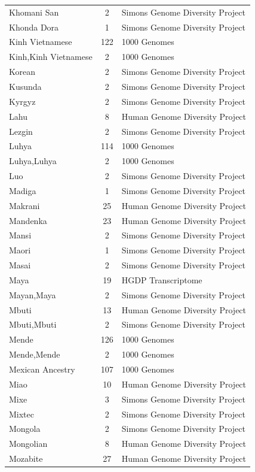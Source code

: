 \begin{longtable}[t]{lcl}
Khomani San & 2 & Simons Genome Diversity Project\\
Khonda Dora & 1 & Simons Genome Diversity Project\\
Kinh Vietnamese & 122 & 1000 Genomes\\
Kinh,Kinh Vietnamese & 2 & 1000 Genomes\\
Korean & 2 & Simons Genome Diversity Project\\
Kusunda & 2 & Simons Genome Diversity Project\\
Kyrgyz & 2 & Simons Genome Diversity Project\\
Lahu & 8 & Human Genome Diversity Project\\
Lezgin & 2 & Simons Genome Diversity Project\\
Luhya & 114 & 1000 Genomes\\
Luhya,Luhya & 2 & 1000 Genomes\\
Luo & 2 & Simons Genome Diversity Project\\
Madiga & 1 & Simons Genome Diversity Project\\
Makrani & 25 & Human Genome Diversity Project\\
Mandenka & 23 & Human Genome Diversity Project\\
Mansi & 2 & Simons Genome Diversity Project\\
Maori & 1 & Simons Genome Diversity Project\\
Masai & 2 & Simons Genome Diversity Project\\
Maya & 19 & HGDP Transcriptome\\
Mayan,Maya & 2 & Simons Genome Diversity Project\\
Mbuti & 13 & Human Genome Diversity Project\\
Mbuti,Mbuti & 2 & Simons Genome Diversity Project\\
Mende & 126 & 1000 Genomes\\
Mende,Mende & 2 & 1000 Genomes\\
Mexican Ancestry & 107 & 1000 Genomes\\
Miao & 10 & Human Genome Diversity Project\\
Mixe & 3 & Simons Genome Diversity Project\\
Mixtec & 2 & Simons Genome Diversity Project\\
Mongola & 2 & Simons Genome Diversity Project\\
Mongolian & 8 & Human Genome Diversity Project\\
Mozabite & 27 & Human Genome Diversity Project\\

\end{longtable}
